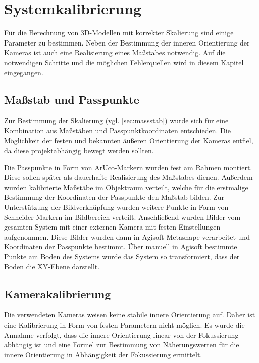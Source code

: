 \documentclass[./00PhotoBox.tex]{subfiles}
\begin{document}
\chapter{Systemkalibrierung}

Für die Berechnung von 3D-Modellen mit korrekter Skalierung sind einige Parameter zu bestimmen. Neben der Bestimmung der inneren Orientierung der Kameras ist auch eine Realisierung eines Maßstabes notwendig. Auf die notwendigen Schritte und die möglichen Fehlerquellen wird in diesem Kapitel eingegangen.

\section{Maßstab und Passpunkte}
\label{sec:passpunkt_bestimmung}
Zur Bestimmung der Skalierung (vgl. \autoref{sec:massstab}) wurde sich für eine Kombination aus Maßstäben und Passpunktkoordinaten entschieden. Die Möglichkeit der festen und bekannten äußeren Orientierung der Kameras entfiel, da diese projektabhängig bewegt werden sollten.

Die Passpunkte in Form von ArUco-Markern wurden fest am Rahmen montiert. Diese sollen später als dauerhafte Realisierung des Maßstabes dienen. Außerdem wurden kalibrierte Maßstäbe im Objektraum verteilt, welche für die erstmalige Bestimmung der Koordinaten der Passpunkte den Maßstab bilden. Zur Unterstützung der Bildverknüpfung wurden weitere Punkte in Form von Schneider-Markern im Bildbereich verteilt. Anschließend wurden Bilder vom gesamten System mit  einer externen Kamera mit festen Einstellungen aufgenommen. Diese Bilder wurden dann in Agisoft Metashape verarbeitet und Koordinaten der Passpunkte bestimmt. Über manuell in Agisoft bestimmte Punkte am Boden des Systems wurde das System so transformiert, dass der Boden die XY-Ebene darstellt.

\section{Kamerakalibrierung}
Die verwendeten Kameras weisen keine stabile innere Orientierung auf. Daher ist eine Kalibrierung in Form von festen Parametern nicht möglich. Es wurde die Annahme verfolgt, dass die innere Orientierung linear von der Fokussierung abhängig ist und eine Formel zur Bestimmung von Näherungswerten für die innere Orientierung in Abhängigkeit der Fokussierung ermittelt.
\end{document}
